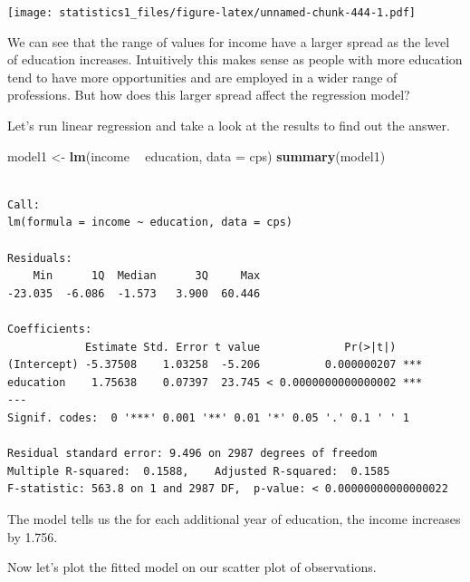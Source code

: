 \documentclass[]{article}
\newenvironment{Shaded}{\begin{snugshade}}{\end{snugshade}}
\newcommand{\KeywordTok}[1]{\textcolor[rgb]{0.13,0.29,0.53}{\textbf{#1}}}
\newcommand{\DataTypeTok}[1]{\textcolor[rgb]{0.13,0.29,0.53}{#1}}
\newcommand{\DecValTok}[1]{\textcolor[rgb]{0.00,0.00,0.81}{#1}}
\newcommand{\FloatTok}[1]{\textcolor[rgb]{0.00,0.00,0.81}{#1}}
\newcommand{\StringTok}[1]{\textcolor[rgb]{0.31,0.60,0.02}{#1}}
\newcommand{\OperatorTok}[1]{\textcolor[rgb]{0.81,0.36,0.00}{\textbf{#1}}}
\newcommand{\NormalTok}[1]{#1}
\theoremstyle{definition}
\theoremstyle{definition}
\theoremstyle{definition}
\theoremstyle{remark}
\begin{document}
\texttt{[image: statistics1\_files/figure-latex/unnamed-chunk-444-1.pdf]}

We can see that the range of values for income have a larger spread as
the level of education increases. Intuitively this makes sense as people
with more education tend to have more opportunities and are employed in
a wider range of professions. But how does this larger spread affect the
regression model?

Let's run linear regression and take a look at the results to find out
the answer.

\begin{Shaded}
\begin{Highlighting}[]
\NormalTok{model1 <-}\StringTok{ }\KeywordTok{lm}\NormalTok{(income }\OperatorTok{~}\StringTok{ }\NormalTok{education, }\DataTypeTok{data =}\NormalTok{ cps)}
\KeywordTok{summary}\NormalTok{(model1)}
\end{Highlighting}
\end{Shaded}

\begin{verbatim}

Call:
lm(formula = income ~ education, data = cps)

Residuals:
    Min      1Q  Median      3Q     Max 
-23.035  -6.086  -1.573   3.900  60.446 

Coefficients:
            Estimate Std. Error t value             Pr(>|t|)    
(Intercept) -5.37508    1.03258  -5.206          0.000000207 ***
education    1.75638    0.07397  23.745 < 0.0000000000000002 ***
---
Signif. codes:  0 '***' 0.001 '**' 0.01 '*' 0.05 '.' 0.1 ' ' 1

Residual standard error: 9.496 on 2987 degrees of freedom
Multiple R-squared:  0.1588,    Adjusted R-squared:  0.1585 
F-statistic: 563.8 on 1 and 2987 DF,  p-value: < 0.00000000000000022
\end{verbatim}

The model tells us the for each additional year of education, the income
increases by 1.756.

Now let's plot the fitted model on our scatter plot of observations.

\begin{Shaded}
\end{Shaded}
\end{document}
